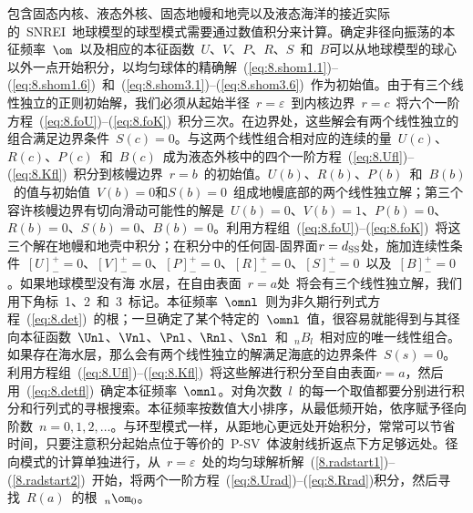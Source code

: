 包含固态内核、液态外核、固态地幔和地壳以及液态海洋的接近实际的~SNREI~地球模型的球型模式需要通过数值积分来计算。确定非径向振荡的本征频率~$\om$~以及相应的本征函数~$U$、$V$、$P$、$R$、$S$~和~$B$可以从地球模型的球心以外一点开始积分，以均匀球体的精确解~(\ref{eq:8.shom1.1})--(\ref{eq:8.shom1.6})~和~(\ref{eq:8.shom3.1})--(\ref{eq:8.shom3.6})~作为初始值。由于有三个线性独立的正则初始解，我们必须从起始半径~$r=\varepsilon$~到内核边界~$r=c$~将六个一阶方程~(\ref{eq:8.foU})--(\ref{eq:8.foK})~积分三次。在边界处，这些解会有两个线性独立的组合满足边界条件~$S(c)=0$。与这两个线性组合相对应的连续的量~$U(c)$、$R(c)$、$P(c)$~和~$B(c)$~成为液态外核中的四个一阶方程~(\ref{eq:8.Ufl})--(\ref{eq:8.Kfl})~积分到核幔边界~$r=b$~的初始值。$U(b)$、$R(b)$、$P(b)$~和~$B(b)$~的值与初始值~$V(b)=0$和$S(b)=0$~组成地幔底部的两个线性独立解；第三个容许核幔边界有切向滑动可能性的解是~$U(b)=0$、$V(b)=1$、$P(b)=0$、$R(b)=0$、$S(b)=0$、$B(b)=0$。利用方程组~(\ref{eq:8.foU})--(\ref{eq:8.foK})~将这三个解在地幔和地壳中积分；在积分中的任何固-固界面$r=d_{\rm SS}$处，施加连续性条件~$[U]^+_-=0$、$[V]^+_-=0$、$[P]^+_-=0$、$[R]^+_-=0$、$[S]^+_-=0$~以及~$[B]^+_-=0$。如果地球模型没有海
水层，在自由表面~$r=a$处~将会有三个线性独立解，我们用下角标~1、2~和~3~标记。本征频率~$\omnl$~则为非久期行列式方程~(\ref{eq:8.det})~的根；一旦确定了某个特定的~$\omnl$~值，很容易就能得到与其径向本征函数~$\Unl$、$\Vnl$、$\Pnl$、$\Rnl$、$\Snl$~和~${}_nB_l$~相对应的唯一线性组合。如果存在海水层，那么会有两个线性独立的解满足海底的边界条件~$S(s)=0$。利用方程组~(\ref{eq:8.Ufl})--(\ref{eq:8.Kfl})~将这些解进行积分至自由表面$r=a$，然后用~(\ref{eq:8.detfl})~确定本征频率~$\omnl$。对角次数~$l$~的每一个取值都要分别进行积分和行列式的寻根搜索。本征频率按数值大小排序，从最低频开始，依序赋予径向阶数~$n=0,1,2,\ldots$。与环型模式一样，从距地心更远处开始积分，常常可以节省时间，只要注意积分起始点位于等价的~P-SV~体波射线折返点下方足够远处。径向模式的计算单独进行，从~$r=\varepsilon$~处的均匀球解析解~(\ref{8.radstart1})--(\ref{8.radstart2})~开始，将两个一阶方程~(\ref{eq:8.Urad})--(\ref{eq:8.Rrad})积分，然后寻找~$R(a)$~的根~${}_n\om_0$。
